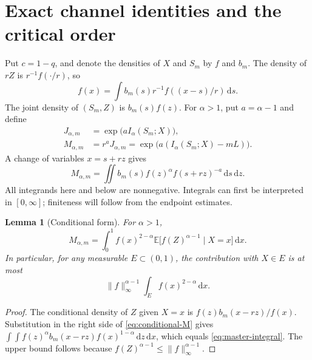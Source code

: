 \documentclass[11pt,a4paper]{article}
\numberwithin{equation}{section}
\newtheorem{lemma}[lemma]{Lemma}
\theoremstyle{definition}\newaliascnt{definition}{theorem}
\theoremstyle{remark}\newaliascnt{remark}{theorem}
\newcommand{\E}{\mathbb E}\newcommand{\Prb}{\mathbb P}
\newcommand{\dd}{\,\mathrm d}
\begin{document}
\section{Exact channel identities and the critical order}
\label{sec:channel}
Put $c=1-q$, and denote the densities of $X$ and $S_m$ by $f$ and $b_m$.
The density of $rZ$ is $r^{-1}f(\cdot/r)$, so
\begin{equation}
 f(x)=\int b_m(s)r^{-1}f((x-s)/r)\dd s.
 \label{eq:convolution}
\end{equation}
The joint density of $(S_m,Z)$ is $b_m(s)f(z)$. For $\alpha>1$, put
$a=\alpha-1$ and define
\begin{align}
 J_{\alpha,m}&=\exp\bigl(a I_\alpha(S_m;X)\bigr),\label{eq:J}\\
 M_{\alpha,m}&=r^aJ_{\alpha,m}
       =\exp\bigl(a(I_\alpha(S_m;X)-mL)\bigr).
 \label{eq:M}
\end{align}
A change of variables $x=s+rz$ gives
\begin{equation}
 M_{\alpha,m}
 =\iint b_m(s)f(z)^\alpha f(s+rz)^{-a}\dd s\dd z.
 \label{eq:master-integral}
\end{equation}
All integrands here and below are nonnegative. Integrals can first be
interpreted in $[0,\infty]$; finiteness will follow from the endpoint estimates.

\begin{lemma}[Conditional form]
\label{lem:conditional}
For $\alpha>1$,
\begin{equation}
 M_{\alpha,m}=
 \int_0^1 f(x)^{2-\alpha}
       \E\bigl[f(Z)^{\alpha-1}\mid X=x\bigr]\dd x.
 \label{eq:conditional-M}
\end{equation}
In particular, for any measurable $E\subset(0,1)$, the contribution with
$X\in E$ is at most
\begin{equation}
 \|f\|_\infty^{\alpha-1}\int_E f(x)^{2-\alpha}\dd x.
 \label{eq:central-bound}
\end{equation}
\end{lemma}
\begin{proof}
The conditional density of $Z$ given $X=x$ is
$f(z)b_m(x-rz)/f(x)$. Substitution in the right side of
\eqref{eq:conditional-M} gives
$\int\!\int f(z)^\alpha b_m(x-rz)f(x)^{1-\alpha}\dd z\dd x$,
which equals \eqref{eq:master-integral}. The upper bound follows because
$f(Z)^{\alpha-1}\le\|f\|_\infty^{\alpha-1}$.
\end{proof}
\end{document}
